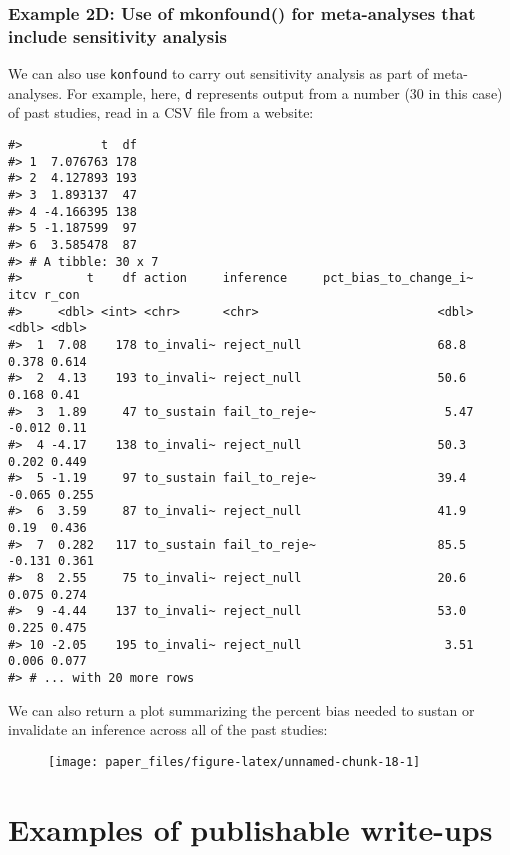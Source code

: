\documentclass[man]{apa6}
\begin{document}
\subsubsection{Example 2D: Use of mkonfound() for meta-analyses that
include sensitivity
analysis}\label{example-2d-use-of-mkonfound-for-meta-analyses-that-include-sensitivity-analysis}

We can also use \texttt{konfound} to carry out sensitivity analysis as
part of meta-analyses. For example, here, \texttt{d} represents output
from a number (30 in this case) of past studies, read in a CSV file from
a website:

\begin{verbatim}
#>           t  df
#> 1  7.076763 178
#> 2  4.127893 193
#> 3  1.893137  47
#> 4 -4.166395 138
#> 5 -1.187599  97
#> 6  3.585478  87
#> # A tibble: 30 x 7
#>         t    df action     inference     pct_bias_to_change_i~   itcv r_con
#>     <dbl> <int> <chr>      <chr>                         <dbl>  <dbl> <dbl>
#>  1  7.08    178 to_invali~ reject_null                   68.8   0.378 0.614
#>  2  4.13    193 to_invali~ reject_null                   50.6   0.168 0.41 
#>  3  1.89     47 to_sustain fail_to_reje~                  5.47 -0.012 0.11 
#>  4 -4.17    138 to_invali~ reject_null                   50.3   0.202 0.449
#>  5 -1.19     97 to_sustain fail_to_reje~                 39.4  -0.065 0.255
#>  6  3.59     87 to_invali~ reject_null                   41.9   0.19  0.436
#>  7  0.282   117 to_sustain fail_to_reje~                 85.5  -0.131 0.361
#>  8  2.55     75 to_invali~ reject_null                   20.6   0.075 0.274
#>  9 -4.44    137 to_invali~ reject_null                   53.0   0.225 0.475
#> 10 -2.05    195 to_invali~ reject_null                    3.51  0.006 0.077
#> # ... with 20 more rows
\end{verbatim}

We can also return a plot summarizing the percent bias needed to sustan
or invalidate an inference across all of the past studies:

\begin{figure}

{\centering \texttt{[image: paper\_files/figure-latex/unnamed-chunk-18-1]} 

}

\caption{ }\label{fig:unnamed-chunk-18}
\end{figure}

\section{Examples of publishable
write-ups}\label{examples-of-publishable-write-ups}
\end{document}
